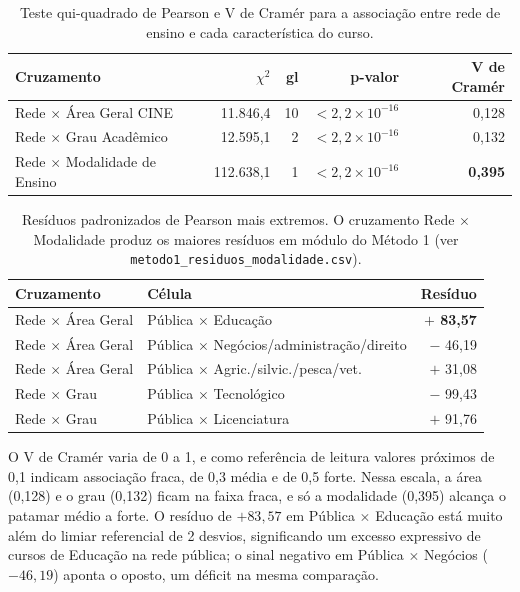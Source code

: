 \documentclass[12pt]{article}
\begin{document}
\begin{table}[h]
\centering
\small
\begin{tabular}{lrrrr}
\toprule
Cruzamento & $\chi^2$ & gl & p-valor & V de Cramér \\
\midrule
Rede $\times$ Área Geral CINE     & 11.846,4  & 10 & $<2{,}2\times10^{-16}$ & 0,128 \\
Rede $\times$ Grau Acadêmico      & 12.595,1  & 2  & $<2{,}2\times10^{-16}$ & 0,132 \\
Rede $\times$ Modalidade de Ensino & 112.638,1 & 1  & $<2{,}2\times10^{-16}$ & \textbf{0,395} \\
\bottomrule
\end{tabular}
\caption{Teste qui-quadrado de Pearson e V de Cramér para a associação entre rede de ensino e cada característica do curso.}
\label{tab:qui}
\end{table}

\begin{table}[h]
\centering
\footnotesize
\begin{tabular}{llr}
\toprule
Cruzamento & Célula & Resíduo \\
\midrule
Rede $\times$ Área Geral & Pública $\times$ Educação                         & \textbf{$+$ 83,57} \\
Rede $\times$ Área Geral & Pública $\times$ Negócios/administração/direito   & $-$ 46,19 \\
Rede $\times$ Área Geral & Pública $\times$ Agric./silvic./pesca/vet.         & $+$ 31,08 \\
Rede $\times$ Grau       & Pública $\times$ Tecnológico                      & $-$ 99,43 \\
Rede $\times$ Grau       & Pública $\times$ Licenciatura                     & $+$ 91,76 \\
\bottomrule
\end{tabular}
\caption{Resíduos padronizados de Pearson mais extremos. O cruzamento Rede $\times$ Modalidade produz os maiores resíduos em módulo do Método 1 (ver \texttt{metodo1\_residuos\_modalidade.csv}).}
\label{tab:residuos}
\end{table}

O V de Cramér varia de 0 a 1, e como referência de leitura valores próximos de 0,1 indicam associação fraca, de 0,3 média e de 0,5 forte. Nessa escala, a área (0,128) e o grau (0,132) ficam na faixa fraca, e só a modalidade (0,395) alcança o patamar médio a forte. O resíduo de $+83{,}57$ em Pública $\times$ Educação está muito além do limiar referencial de 2 desvios, significando um excesso expressivo de cursos de Educação na rede pública; o sinal negativo em Pública $\times$ Negócios ($-46{,}19$) aponta o oposto, um déficit na mesma comparação.
\end{document}
